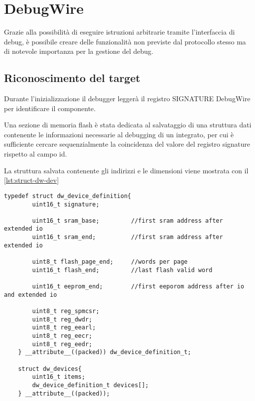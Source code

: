 \section{DebugWire}

Grazie alla possibilità di eseguire istruzioni arbitrarie tramite l'interfaccia di debug, è possibile creare delle funzionalità non previste dal protocollo stesso ma di notevole importanza per la gestione del debug.

\subsection{Riconoscimento del target}

Durante l'inizializzazione il debugger leggerà il registro SIGNATURE DebugWire per identificare il componente.

Una sezione di memoria flash è stata dedicata al salvataggio di una struttura dati contenente le informazioni necessarie al debugging di un integrato, per cui è sufficiente cercare sequenzialmente la coincidenza del valore del registro signature rispetto al campo id.

La struttura salvata contenente gli indirizzi e le dimensioni viene mostrata con il \cref{lst:struct-dw-dev}

\noindent\begin{minipage}{\textwidth}
    \begin{lstlisting}[style=C, caption={Strutture utilizzate nel codice finale per il salvataggio e la ricerca dei parametri associati al target connesso}, label=lst:struct-dw-dev]
    typedef struct dw_device_definition{
        uint16_t signature;

        uint16_t sram_base;         //first sram address after extended io
        uint16_t sram_end;          //first sram address after extended io

        uint8_t flash_page_end;     //words per page
        uint16_t flash_end;         //last flash valid word

        uint16_t eeprom_end;        //first eeporom address after io and extended io

        uint8_t reg_spmcsr;
        uint8_t reg_dwdr;
        uint8_t reg_eearl;
        uint8_t reg_eecr;
        uint8_t reg_eedr;
    } __attribute__((packed)) dw_device_definition_t;

    struct dw_devices{
        uint16_t items;
        dw_device_definition_t devices[];
    } __attribute__((packed));
    \end{lstlisting}
\end{minipage}

